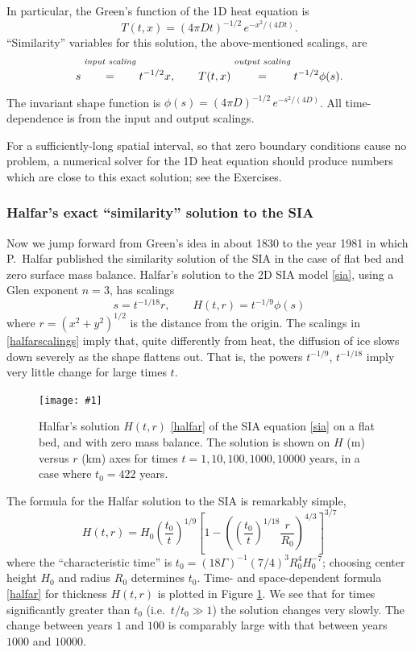\documentclass[letterpaper,final,12pt,reqno]{amsart}
\newcommand{\onefigsize}[3]{
\begin{figure}[ht]
\centering
\texttt{[image: \#1]}
\caption{#2}
\label{fig:#1}
\end{figure}}
\begin{document}
In particular, the Green's function of the 1D heat equation is
  $$T(t,x) = (4 \pi D t)^{-1/2}\, e^{-x^2/(4Dt)}.$$
``Similarity'' variables for this solution, the above-mentioned scalings, are
	$$s \stackrel{\text{\emph{input scaling}}}{\phantom{\Big|}=\phantom{\Big|}} t^{-1/2} x, \qquad T(t,x) \stackrel{\text{\emph{output scaling}}}{\phantom{\Big|}=\phantom{\Big|}} t^{-1/2} \phi(s).$$
The invariant shape function is $\phi(s) = (4 \pi D)^{-1/2}\, e^{-s^2/(4D)}$.  All time-dependence is from the input and output scalings.

For a sufficiently-long spatial interval, so that zero boundary conditions cause no problem, a numerical solver for the 1D heat equation should produce numbers which are close to this exact solution; see the Exercises.

\subsubsection*{Halfar's exact ``similarity'' solution to the SIA}  Now we jump forward from Green's idea in about 1830 to the year 1981 in which P.~Halfar published the similarity solution of the SIA in the case of flat bed and zero surface mass balance.  Halfar's solution to the 2D SIA model \eqref{sia}, using a Glen exponent $n=3$, has scalings
\begin{equation}
s = t^{-1/18} r, \qquad H(t,r)=t^{-1/9} \phi(s) \label{halfarscalings}
\end{equation}
where $r=(x^2+y^2)^{1/2}$ is the distance from the origin.  The scalings in \eqref{halfarscalings} imply that, quite differently from heat, the diffusion of ice slows down severely as the shape flattens out.  That is, the powers $t^{-1/9}$, $t^{-1/18}$ imply very little change for large times $t$.

\onefigsize{siascaling}{Halfar's solution $H(t,r)$ \eqref{halfar} of the SIA equation \eqref{sia} on a flat bed, and with zero mass balance.  The solution is shown on $H$ (m) versus $r$ (km) axes for times $t=1,10,100,1000,10000$ years, in a case where $t_0=422$ years.}{5.5in}

The formula for the Halfar solution to the SIA is remarkably simple,
\begin{equation}
H(t,r) = H_0 \left(\frac{t_0}{t}\right)^{1/9} \left[1 - \left(\left(\frac{t_0}{t}\right)^{1/18} \frac{r}{R_0}\right)^{4/3}\right]^{3/7} \label{halfar}
\end{equation}
where the ``characteristic time'' is $t_0 = (18 \Gamma)^{-1} (7/4)^3 R_0^4 H_0^{-7}$; choosing center height $H_0$ and radius $R_0$ determines $t_0$.  Time- and space-dependent formula \eqref{halfar} for thickness $H(t,r)$ is plotted in Figure \ref{fig:siascaling}.  We see that for times significantly greater than $t_0$ (i.e.~$t/t_0 \gg 1$) the solution changes very slowly.  The change between years $1$ and $100$ is comparably large with that between years $1000$ and $10000$.
\end{document}
